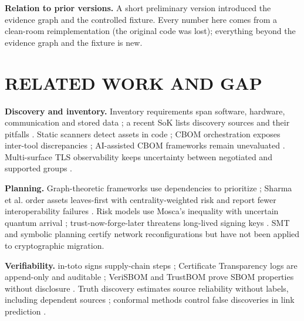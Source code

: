 \documentclass[a4paper,twoside]{article}
\begin{document}
\textbf{Relation to prior versions.} A short preliminary version \cite{cesar2026cigma} introduced the evidence graph and the controlled fixture. Every number here comes from a clean-room reimplementation (the original code was lost); everything beyond the evidence graph and the fixture is new.

\section{\uppercase{Related Work and Gap}}
\label{sec:related}

\textbf{Discovery and inventory.} Inventory requirements span software, hardware, communication and stored data \cite{schmitt2024criteria}; a recent SoK lists discovery sources and their pitfalls \cite{yamamuro2026sok}. Static scanners detect assets in code \cite{rahaman2019cryptoguard,nather2026hidden}; CBOM orchestration exposes inter-tool discrepancies \cite{bogli2026bfcbom}; AI-assisted CBOM frameworks remain unevaluated \cite{grover2026cbom}. Multi-surface TLS observability keeps uncertainty between negotiated and supported groups \cite{delgado2026observability}.

\textbf{Planning.} Graph-theoretic frameworks use dependencies to prioritize \cite{hasan2024framework}; Sharma et al. order assets leaves-first with centrality-weighted risk and report fewer interoperability failures \cite{sharma2026dependency}. Risk models use Mosca's inequality \cite{mosca2018cybersecurity} with uncertain quantum arrival \cite{gupta2026readiness,shaw2026costofdelay}; trust-now-forge-later threatens long-lived signing keys \cite{grover2026cbom,campbell2026agentic}. SMT and symbolic planning certify network reconfigurations \cite{robillard2022smt,chen2025safemigration} but have not been applied to cryptographic migration.

\textbf{Verifiability.} in-toto signs supply-chain steps \cite{torresarias2019intoto}; Certificate Transparency logs are append-only and auditable \cite{rfc6962,rfc9162}; VeriSBOM and TrustBOM prove SBOM properties without disclosure \cite{castiglione2026verisbom,nguyen2026trustbom}. Truth discovery estimates source reliability without labels, including dependent sources \cite{wang2026depenbaye,benshabat2022empirical}; conformal methods control false discoveries in link prediction \cite{bates2023conformal,du2025conformallink,zhao2024conformallink}.
\end{document}
